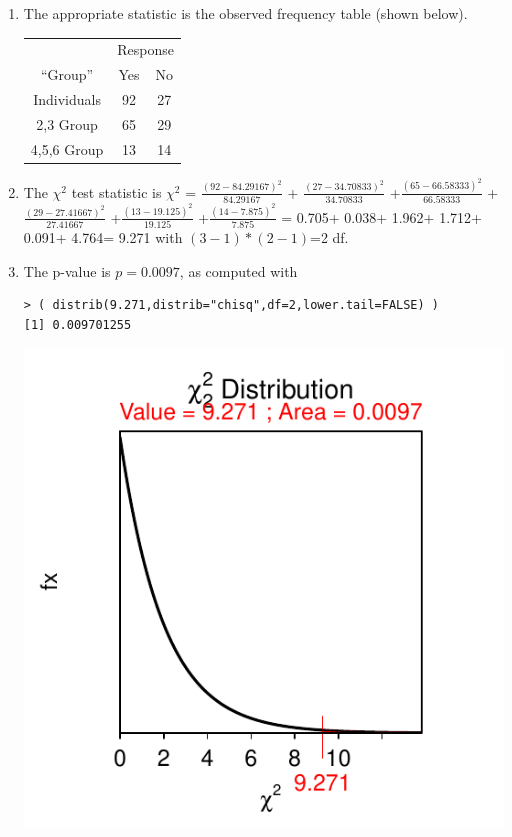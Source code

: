 \documentclass[10pt,openany]{book}\usepackage[]{graphicx}\usepackage[]{color}
\makeatletter
\newenvironment{kframe}{%
 \def\at@end@of@kframe{}%
 \ifinner\ifhmode%
  \def\at@end@of@kframe{\end{minipage}}%
  \begin{minipage}{\columnwidth}%
 \fi\fi%
 \def\FrameCommand##1{\hskip\@totalleftmargin \hskip-\fboxsep
 \colorbox{shadecolor}{##1}\hskip-\fboxsep
     \hskip-\linewidth \hskip-\@totalleftmargin \hskip\columnwidth}%
 \MakeFramed {\advance\hsize-\width
   \@totalleftmargin\z@ \linewidth\hsize
   \@setminipage}}%
 {\par\unskip\endMakeFramed%
 \at@end@of@kframe}
\newenvironment{knitrout}{}{} %
\makeatother
\begin{document}
\begin{itemize}
\begin{enumerate}
      \item The appropriate statistic is the observed frequency table (shown below).
        \begin{center}
          \begin{tabular}{|c|c|c|}
            \multicolumn{1}{c}{} & \multicolumn{2}{c}{Response} \\
            \cline{2-3}
            \multicolumn{1}{c|}{``Group''} & Yes & No \\
            \hline
            Individuals & 92 & 27 \\
            \hline
            2,3 Group & 65 & 29 \\
            \hline
            4,5,6 Group & 13 & 14 \\
            \hline
          \end{tabular}
        \end{center}
      \item The $\chi^{2}$ test statistic is $\chi^{2}$ = $\frac{(92-84.29167)^{2}}{84.29167}$ + $\frac{(27-34.70833)^{2}}{34.70833}$ +$\frac{(65-66.58333)^{2}}{66.58333}$ +$\frac{(29-27.41667)^{2}}{27.41667}$ +$\frac{(13-19.125)^{2}}{19.125}$ +$\frac{(14-7.875)^{2}}{7.875}$ = 0.705+ 0.038+ 1.962+ 1.712+ 0.091+ 4.764= 9.271 with $(3-1)*(2-1)$=2 df.
      \item The p-value is $p=0.0097$, as computed with
\begin{knitrout}
\color{fgcolor}\begin{kframe}
\begin{verbatim}
> ( distrib(9.271,distrib="chisq",df=2,lower.tail=FALSE) )
[1] 0.009701255
\end{verbatim}
\end{kframe}

{\centering \includegraphics[width=.4\linewidth]{Figs/unnamed-chunk-448-1} 

}




\end{knitrout}
\end{enumerate}
\end{itemize}
\end{document}
